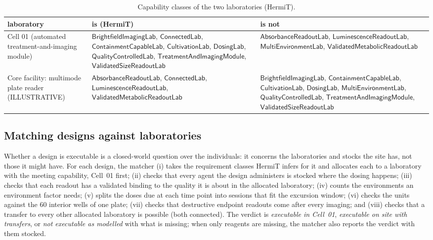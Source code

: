 \documentclass[10pt,a4paper]{article}
\begin{document}
\begin{table}[tbp]\centering\footnotesize
\caption{Capability classes of the two laboratories (HermiT).}\label{tab:labcaps}
\begin{tabularx}{\linewidth}{@{}>{\raggedright\arraybackslash}p{3.2cm}>{\raggedright\arraybackslash}X>{\raggedright\arraybackslash}X@{}}\toprule laboratory & is (HermiT) & is not \\ \midrule
Cell 01 (automated treatment-and-imaging module) & $\mathsf{BrightfieldImagingLab}$, $\mathsf{ConnectedLab}$, $\mathsf{ContainmentCapableLab}$, $\mathsf{CultivationLab}$, $\mathsf{DosingLab}$, $\mathsf{QualityControlledLab}$, $\mathsf{TreatmentAndImagingModule}$, $\mathsf{ValidatedSizeReadoutLab}$ & $\mathsf{AbsorbanceReadoutLab}$, $\mathsf{LuminescenceReadoutLab}$, $\mathsf{MultiEnvironmentLab}$, $\mathsf{ValidatedMetabolicReadoutLab}$ \\
Core facility: multimode plate reader (ILLUSTRATIVE) & $\mathsf{AbsorbanceReadoutLab}$, $\mathsf{ConnectedLab}$, $\mathsf{LuminescenceReadoutLab}$, $\mathsf{ValidatedMetabolicReadoutLab}$ & $\mathsf{BrightfieldImagingLab}$, $\mathsf{ContainmentCapableLab}$, $\mathsf{CultivationLab}$, $\mathsf{DosingLab}$, $\mathsf{MultiEnvironmentLab}$, $\mathsf{QualityControlledLab}$, $\mathsf{TreatmentAndImagingModule}$, $\mathsf{ValidatedSizeReadoutLab}$ \\
\bottomrule\end{tabularx}\end{table}


\subsection{Matching designs against laboratories}
Whether a design is executable is a closed-world question over the individuals: it concerns the laboratories and
stocks the site has, not those it might have. For each design, the matcher (i) takes the requirement classes HermiT
infers for it and allocates each to a laboratory with the meeting capability, Cell~01 first; (ii) checks that every
agent the design administers is stocked where the dosing happens; (iii) checks that each readout has a validated
binding to the quality it is about in the allocated laboratory; (iv) counts the environments an environment factor
needs; (v) splits the doses due at each time point into sessions that fit the excursion window; (vi) checks the units
against the 60 interior wells of one plate; (vii) checks that destructive endpoint readouts come
after every imaging; and (viii) checks that a transfer to every other allocated laboratory is possible (both
connected). The verdict is \emph{executable in Cell~01}, \emph{executable on site with transfers}, or \emph{not
executable as modelled} with what is missing; when only reagents are missing, the matcher also reports the verdict
with them stocked.
\end{document}
